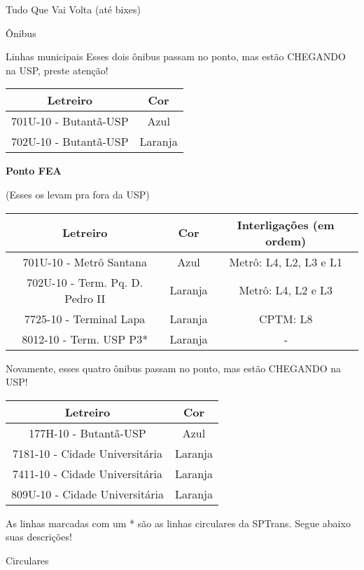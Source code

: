\begin{secao}{Tudo Que Vai Volta (até bixes)}
\begin{subsecao}{Ônibus}
\begin{subsubsecao}{Linhas municipais}
Esses dois ônibus passam no ponto, mas estão CHEGANDO na USP, preste 
atenção!

\begin{center}
	\begin{tabular}{|c|c|}
	  \hline
	  Letreiro & Cor\\
	  \hline
	  701U-10 - Butantã-USP & Azul\\
	  702U-10 - Butantã-USP & Laranja\\
	  \hline
	\end{tabular}
\end{center}

{\bf Ponto FEA}

(Esses os levam pra fora da USP)
\begin{center}
	\begin{tabular}{|c|c|c|}
      \hline
	  Letreiro & Cor & Interligações (em ordem)\\
	  \hline
	  701U-10 - Metrô Santana & Azul & Metrô: L4, L2, L3 e L1\\
	  702U-10 - Term. Pq. D. Pedro II & Laranja & Metrô: L4, L2 e L3\\
	  7725-10 - Terminal Lapa & Laranja & CPTM: L8\\
	  8012-10 - Term. USP P3* & Laranja & -\\
      \hline
	\end{tabular}
\end{center}

Novamente, esses quatro ônibus passam no ponto, mas estão CHEGANDO na USP!
\begin{center}
	\begin{tabular}{|c|c|}
	  \hline
	  Letreiro & Cor\\
	  \hline
	  177H-10 - Butantã-USP & Azul\\
	  7181-10 - Cidade Universitária & Laranja\\
	  7411-10 - Cidade Universitária & Laranja\\
	  809U-10 - Cidade Universitária & Laranja\\
	  \hline
	\end{tabular}
\end{center}

As linhas marcadas com um * são as linhas circulares da SPTrans.
Segue abaixo suas descrições!

\end{subsubsecao}

\begin{subsubsecao}{Circulares}


\end{subsubsecao}
\end{subsecao}
\end{secao}
